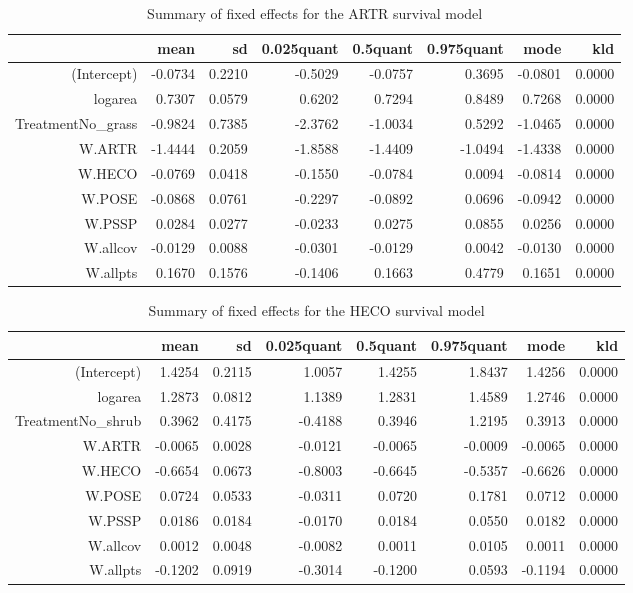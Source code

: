 \begin{table}[ht]
\centering
\caption{Summary of fixed effects for the ARTR survival model} 
\label{ARTRsurvival}
\begin{tabular}{rrrrrrrr}
  \hline
 & mean & sd & 0.025quant & 0.5quant & 0.975quant & mode & kld \\ 
  \hline
(Intercept) & -0.0734 & 0.2210 & -0.5029 & -0.0757 & 0.3695 & -0.0801 & 0.0000 \\ 
  logarea & 0.7307 & 0.0579 & 0.6202 & 0.7294 & 0.8489 & 0.7268 & 0.0000 \\ 
  TreatmentNo\_grass & -0.9824 & 0.7385 & -2.3762 & -1.0034 & 0.5292 & -1.0465 & 0.0000 \\ 
  W.ARTR & -1.4444 & 0.2059 & -1.8588 & -1.4409 & -1.0494 & -1.4338 & 0.0000 \\ 
  W.HECO & -0.0769 & 0.0418 & -0.1550 & -0.0784 & 0.0094 & -0.0814 & 0.0000 \\ 
  W.POSE & -0.0868 & 0.0761 & -0.2297 & -0.0892 & 0.0696 & -0.0942 & 0.0000 \\ 
  W.PSSP & 0.0284 & 0.0277 & -0.0233 & 0.0275 & 0.0855 & 0.0256 & 0.0000 \\ 
  W.allcov & -0.0129 & 0.0088 & -0.0301 & -0.0129 & 0.0042 & -0.0130 & 0.0000 \\ 
  W.allpts & 0.1670 & 0.1576 & -0.1406 & 0.1663 & 0.4779 & 0.1651 & 0.0000 \\ 
   \hline
\end{tabular}
\end{table}

\begin{table}[ht]
\centering
\caption{Summary of fixed effects for the HECO survival model} 
\label{HECOsurvival}
\begin{tabular}{rrrrrrrr}
  \hline
 & mean & sd & 0.025quant & 0.5quant & 0.975quant & mode & kld \\ 
  \hline
(Intercept) & 1.4254 & 0.2115 & 1.0057 & 1.4255 & 1.8437 & 1.4256 & 0.0000 \\ 
  logarea & 1.2873 & 0.0812 & 1.1389 & 1.2831 & 1.4589 & 1.2746 & 0.0000 \\ 
  TreatmentNo\_shrub & 0.3962 & 0.4175 & -0.4188 & 0.3946 & 1.2195 & 0.3913 & 0.0000 \\ 
  W.ARTR & -0.0065 & 0.0028 & -0.0121 & -0.0065 & -0.0009 & -0.0065 & 0.0000 \\ 
  W.HECO & -0.6654 & 0.0673 & -0.8003 & -0.6645 & -0.5357 & -0.6626 & 0.0000 \\ 
  W.POSE & 0.0724 & 0.0533 & -0.0311 & 0.0720 & 0.1781 & 0.0712 & 0.0000 \\ 
  W.PSSP & 0.0186 & 0.0184 & -0.0170 & 0.0184 & 0.0550 & 0.0182 & 0.0000 \\ 
  W.allcov & 0.0012 & 0.0048 & -0.0082 & 0.0011 & 0.0105 & 0.0011 & 0.0000 \\ 
  W.allpts & -0.1202 & 0.0919 & -0.3014 & -0.1200 & 0.0593 & -0.1194 & 0.0000 \\ 
   \hline
\end{tabular}
\end{table}

